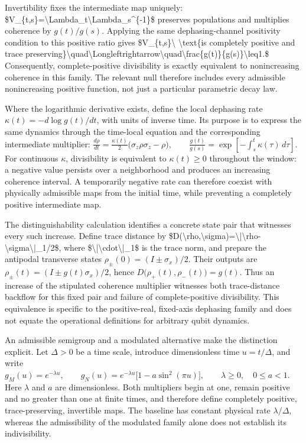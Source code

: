 \documentclass[11pt]{article}
\begin{document}
Invertibility fixes the intermediate map uniquely: \$V\_\{t,s\}=\textbackslash{}Lambda\_t\textbackslash{}Lambda\_s\textasciicircum{}\{-1\}\$ preserves populations and multiplies coherence by $g(t)/g(s)$. Applying the same dephasing-channel positivity condition to this positive ratio gives
\$V\_\{t,s\}\textbackslash{} \textbackslash{}text\{is completely positive and trace preserving\}\textbackslash{}quad\textbackslash{}Longleftrightarrow\textbackslash{}quad\textbackslash{}frac\{g(t)\}\{g(s)\}\textbackslash{}leq1.\$
Consequently, complete-positive divisibility is exactly equivalent to nonincreasing coherence in this family. The relevant null therefore includes every admissible nonincreasing positive function, not just a particular parametric decay law.

Where the logarithmic derivative exists, define the local dephasing rate $\kappa(t)=-d\log g(t)/dt$, with units of inverse time. Its purpose is to express the same dynamics through the time-local equation and the corresponding intermediate multiplier:
$\frac{d\rho}{dt}=\frac{\kappa(t)}{2}\bigl(\sigma_z\rho\sigma_z-\rho\bigr),\qquad \frac{g(t)}{g(s)}=\exp\!\left[-\int_s^t\kappa(\tau)\,d\tau\right].$
For continuous $\kappa$, divisibility is equivalent to $\kappa(t)\geq0$ throughout the window: a negative value persists over a neighborhood and produces an increasing coherence interval. A temporarily negative rate can therefore coexist with physically admissible maps from the initial time, while preventing a completely positive intermediate map.

The distinguishability calculation identifies a concrete state pair that witnesses every such increase. Define trace distance by \$D(\textbackslash{}rho,\textbackslash{}sigma)=\textbackslash{}|\textbackslash{}rho-\textbackslash{}sigma\textbackslash{}|\_1/2\$, where \$\textbackslash{}|\textbackslash{}cdot\textbackslash{}|\_1\$ is the trace norm, and prepare the antipodal transverse states $\rho_\pm(0)=(I\pm\sigma_x)/2$. Their outputs are $\rho_\pm(t)=(I\pm g(t)\sigma_x)/2$, hence
$D\bigl(\rho_+(t),\rho_-(t)\bigr)=g(t).$
Thus an increase of the stipulated coherence multiplier witnesses both trace-distance backflow for this fixed pair and failure of complete-positive divisibility. This equivalence is specific to the positive-real, fixed-axis dephasing family and does not equate the operational definitions for arbitrary qubit dynamics.

An admissible semigroup and a modulated alternative make the distinction explicit. Let $\Delta>0$ be a time scale, introduce dimensionless time $u=t/\Delta$, and write
$g_M(u)=e^{-\lambda u},\qquad g_N(u)=e^{-\lambda u}\bigl[1-a\sin^2(\pi u)\bigr],\qquad \lambda\geq0,\quad 0\leq a<1.$
Here $\lambda$ and $a$ are dimensionless. Both multipliers begin at one, remain positive and no greater than one at finite times, and therefore define completely positive, trace-preserving, invertible maps. The baseline has constant physical rate $\lambda/\Delta$, whereas the admissibility of the modulated family alone does not establish its indivisibility.
\end{document}
